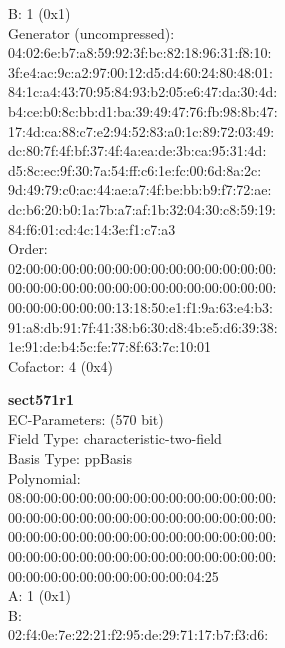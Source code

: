 B:    1 (0x1)\\
Generator (uncompressed):\\
    04:02:6e:b7:a8:59:92:3f:bc:82:18:96:31:f8:10:\\
    3f:e4:ac:9c:a2:97:00:12:d5:d4:60:24:80:48:01:\\
    84:1c:a4:43:70:95:84:93:b2:05:e6:47:da:30:4d:\\
    b4:ce:b0:8c:bb:d1:ba:39:49:47:76:fb:98:8b:47:\\
    17:4d:ca:88:c7:e2:94:52:83:a0:1c:89:72:03:49:\\
    dc:80:7f:4f:bf:37:4f:4a:ea:de:3b:ca:95:31:4d:\\
    d5:8c:ec:9f:30:7a:54:ff:c6:1e:fc:00:6d:8a:2c:\\
    9d:49:79:c0:ac:44:ae:a7:4f:be:bb:b9:f7:72:ae:\\
    dc:b6:20:b0:1a:7b:a7:af:1b:32:04:30:c8:59:19:\\
    84:f6:01:cd:4c:14:3e:f1:c7:a3\\
Order: \\
    02:00:00:00:00:00:00:00:00:00:00:00:00:00:00:\\
    00:00:00:00:00:00:00:00:00:00:00:00:00:00:00:\\
    00:00:00:00:00:00:13:18:50:e1:f1:9a:63:e4:b3:\\
    91:a8:db:91:7f:41:38:b6:30:d8:4b:e5:d6:39:38:\\
    1e:91:de:b4:5c:fe:77:8f:63:7c:10:01\\
Cofactor:  4 (0x4)\\
\item \textbf{ sect571r1 }\\
EC-Parameters: (570 bit)\\
Field Type: characteristic-two-field\\
Basis Type: ppBasis\\
Polynomial:\\
    08:00:00:00:00:00:00:00:00:00:00:00:00:00:00:\\
    00:00:00:00:00:00:00:00:00:00:00:00:00:00:00:\\
    00:00:00:00:00:00:00:00:00:00:00:00:00:00:00:\\
    00:00:00:00:00:00:00:00:00:00:00:00:00:00:00:\\
    00:00:00:00:00:00:00:00:00:00:04:25\\
A:    1 (0x1)\\
B:   \\
    02:f4:0e:7e:22:21:f2:95:de:29:71:17:b7:f3:d6:\\
